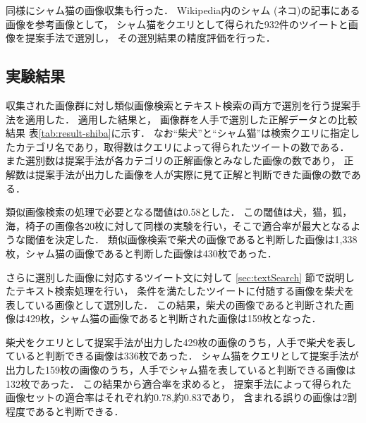 \documentclass{deimj}
\begin{document}
同様にシャム猫の画像収集も行った．
Wikipedia内のシャム (ネコ)の記事にある画像を参考画像として，
シャム猫をクエリとして得られた932件のツイートと画像を提案手法で選別し，
その選別結果の精度評価を行った．

\subsection{実験結果}
\label{sec:expresult}

収集された画像群に対し類似画像検索とテキスト検索の両方で選別を行う提案手法を適用した．
適用した結果と，
画像群を人手で選別した正解データとの比較結果
表\ref{tab:result-shiba}に示す．
なお“柴犬”と“シャム猫”は検索クエリに指定したカテゴリ名であり，取得数はクエリによって得られたツイートの数である．
また選別数は提案手法が各カテゴリの正解画像とみなした画像の数であり，
正解数は提案手法が出力した画像を人が実際に見て正解と判断できた画像の数である．

類似画像検索の処理で必要となる閾値は0.58とした．
この閾値は犬，猫，狐，海，椅子の画像各20枚に対して同様の実験を行い，そこで適合率が最大となるような閾値を決定した．
類似画像検索で柴犬の画像であると判断した画像は1,338枚，シャム猫の画像であると判断した画像は430枚であった．

さらに選別した画像に対応するツイート文に対して
\ref{sec:textSearch}
節で説明したテキスト検索処理を行い，
条件を満たしたツイートに付随する画像を柴犬を表している画像として選別した．
この結果，柴犬の画像であると判断された画像は429枚，シャム猫の画像であると判断された画像は159枚となった．


柴犬をクエリとして提案手法が出力した429枚の画像のうち，人手で柴犬を表していると判断できる画像は336枚であった．
シャム猫をクエリとして提案手法が出力した159枚の画像のうち，人手でシャム猫を表していると判断できる画像は132枚であった．
この結果から適合率を求めると，
提案手法によって得られた画像セットの適合率はそれぞれ約0.78,約0.83であり，
含まれる誤りの画像は2割程度であると判断できる．
\end{document}
